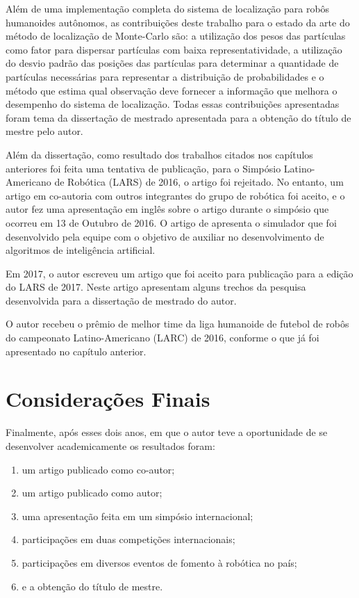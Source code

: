 \documentclass[
  12pt,       %
  oneside,
  a4paper,      %
  english,      %
  french,       %
  spanish,      %
  brazil,       %
  ]{abntex2}
\begin{document}
Além de uma implementação completa do sistema de localização para robôs humanoides autônomos, as contribuições deste trabalho para o estado da arte do método de localização de Monte-Carlo são: a utilização dos pesos das partículas como fator para dispersar partículas com baixa representatividade, a utilização do desvio padrão das posições das partículas para determinar a quantidade de partículas necessárias para representar a distribuição de probabilidades e o método que estima qual observação deve fornecer a informação que melhora o desempenho do sistema de localização.
Todas essas contribuições apresentadas foram tema da dissertação de mestrado apresentada para a obtenção do título de mestre pelo autor.

Além da dissertação, como resultado dos trabalhos citados nos capítulos anteriores foi feita uma tentativa de publicação, para o Simpósio Latino-Americano de Robótica (LARS) de 2016, o artigo foi rejeitado.
No entanto, um artigo em co-autoria com outros integrantes do grupo de robótica foi aceito, e o autor fez uma apresentação em inglês sobre o artigo durante o simpósio que ocorreu em 13 de Outubro de 2016.
O artigo de  apresenta o simulador que foi desenvolvido pela equipe com o objetivo de auxiliar no desenvolvimento de algoritmos de inteligência artificial.

Em 2017, o autor escreveu um artigo que foi aceito para publicação para a edição do LARS de 2017.
Neste artigo  apresentam alguns trechos da pesquisa desenvolvida para a dissertação de mestrado do autor.

O autor recebeu o prêmio de melhor time da liga humanoide de futebol de robôs do campeonato Latino-Americano (LARC) de 2016, conforme o que já foi apresentado no capítulo anterior.


\chapter{Considerações Finais}

Finalmente, após esses dois anos, em que o autor teve a oportunidade de se desenvolver academicamente os resultados foram:
%
\begin{enumerate}
  \item um artigo publicado como co-autor;

  \item um artigo publicado como autor;

  \item uma apresentação feita em um simpósio internacional;

  \item participações em duas competições internacionais;

  \item participações em diversos eventos de fomento à robótica no país;

  \item e a obtenção do título de mestre.
\end{enumerate}
\end{document}
